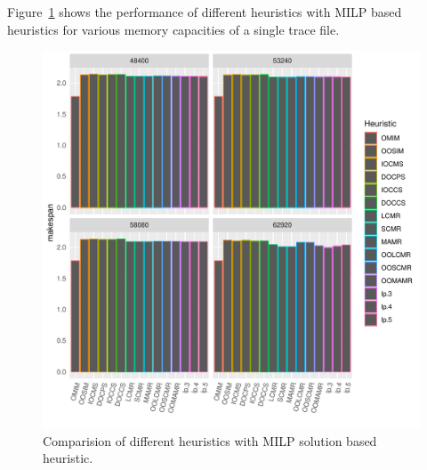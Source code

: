 \documentclass[sigconf]{acmart}
\begin{document}
{		
 Figure~\ref{fig:iterativeLpSolution} shows the performance of different heuristics with MILP based heuristics for various memory capacities of a single trace file.
		\begin{figure}[htb]
			\includegraphics[scale=0.5]{./results/makespan_with_lp.pdf}
			\caption{Comparision of different heuristics with MILP solution based heuristic.}
			\label{fig:iterativeLpSolution}
		\end{figure}
		
}
\end{document}
